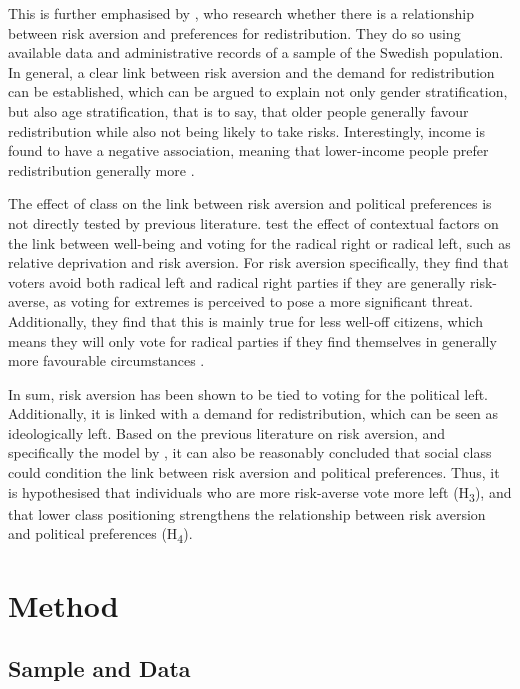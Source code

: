 \documentclass[stu,12pt]{apa7}
\begin{document}
This is further emphasised by \textcite{gartnerIndividualRiskPreferences2017}, who research whether there is a relationship between risk aversion and preferences for redistribution. They do so using available data and administrative records of a sample of the Swedish population. In general, a clear link between risk aversion and the demand for redistribution can be established, which can be argued to explain not only gender stratification, but also age stratification, that is to say, that older people generally favour redistribution while also not being likely to take risks. Interestingly, income is found to have a negative association, meaning that lower-income people prefer redistribution generally more \parencite{gartnerIndividualRiskPreferences2017}.

The effect of class on the link between risk aversion and political preferences is not directly tested by previous literature. \textcite{rooduijnParadoxWellbeingUnfavorable2018a} test the effect of contextual factors on the link between well-being and voting for the radical right or radical left, such as relative deprivation and risk aversion. For risk aversion specifically, they find that voters avoid both radical left and radical right parties if they are generally risk-averse, as voting for extremes is perceived to pose a more significant threat. Additionally, they find that this is mainly true for less well-off citizens, which means they will only vote for radical parties if they find themselves in generally more favourable circumstances \parencite{rooduijnParadoxWellbeingUnfavorable2018a}.

In sum, risk aversion has been shown to be tied to voting for the political left. Additionally, it is linked with a demand for redistribution, which can be seen as ideologically left. Based on the previous literature on risk aversion, and specifically the model by \textcite{rooduijnParadoxWellbeingUnfavorable2018a}, it can also be reasonably concluded that social class could condition the link between risk aversion and political preferences. Thus, it is hypothesised that individuals who are more risk-averse vote more left (H\textsubscript{3}), and that lower class positioning strengthens the relationship between risk aversion and political preferences (H\textsubscript{4}).

\section{Method}

\subsection{Sample and Data}
\end{document}
